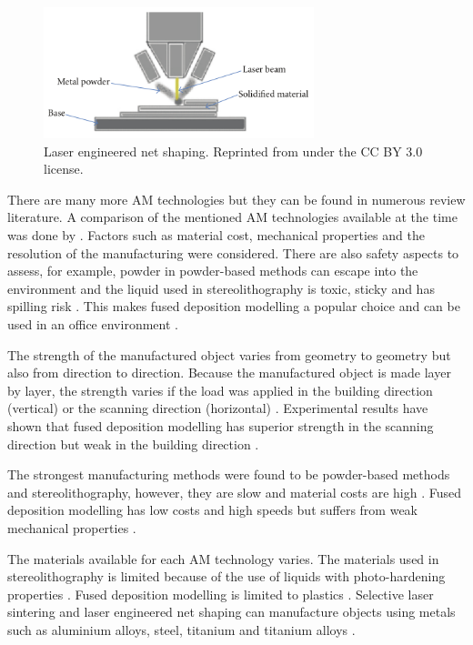 \begin{figure}
  \centering
  \includegraphics[width=0.7\textwidth]{../figures/literatureReview/literature_lens.png}
  \caption{Laser engineered net shaping. Reprinted from \citep{wong2012review} under the CC BY 3.0 license.}
  \label{fig:literature_lens}
\end{figure}

There are many more AM technologies but they can be found in numerous review literature. A comparison of the mentioned AM technologies available at the time was done by \cite{pham1998comparison, kim2008benchmark}. Factors such as material cost, mechanical properties and the resolution of the manufacturing were considered. There are also safety aspects to assess, for example, powder in powder-based methods can escape into the environment and the liquid used in stereolithography is toxic, sticky and has spilling risk \citep{kim2008benchmark}. This makes fused deposition modelling a popular choice and can be used in an office environment \citep{ngo2018additive}.

The strength of the manufactured object varies from geometry to geometry but also from direction to direction. Because the manufactured object is made layer by layer, the strength varies if the load was applied in the building direction (vertical) or the scanning direction (horizontal) \citep{kim2008benchmark}. Experimental results have shown that fused deposition modelling has superior strength in the scanning direction but weak in the building direction \citep{kim2008benchmark}.

The strongest manufacturing methods were found to be powder-based methods and stereolithography, however, they are slow and material costs are high \citep{kim2008benchmark}. Fused deposition modelling has low costs and high speeds but suffers from weak mechanical properties \citep{ngo2018additive}.

The materials available for each AM technology varies. The materials used in stereolithography is limited because of the use of liquids with photo-hardening properties \citep{ngo2018additive}. Fused deposition modelling is limited to plastics \citep{ngo2018additive}. Selective laser sintering and laser engineered net shaping can manufacture objects using metals such as aluminium alloys, steel, titanium and titanium alloys \citep{herzog2016additive}.

